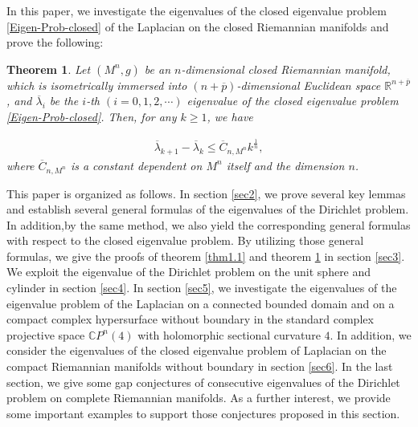\documentclass[12pt]{article}
\newtheorem{thm}{Theorem}[section]
\numberwithin{equation}{section}
\begin{document}
In this paper, we investigate the eigenvalues of the closed eigenvalue problem \eqref{Eigen-Prob-closed} of the Laplacian on the closed Riemannian manifolds and prove the following:

\begin{thm}
\label{thm1.2}Let $(M^{n},g)$ be an $n$-dimensional closed Riemannian manifold, which is isometrically immersed into $(n+\overline{p})$-dimensional Euclidean space $\mathbb{R}^{n+\overline{p}}$, and $\overline{\lambda}_{i}$ be the $i$-th $(i=0,1,2,\cdots)$
eigenvalue of the closed eigenvalue problem \eqref{Eigen-Prob-closed}. Then, for any $k\geq1$, we have


\begin{equation}\label{z1}\begin{aligned}\overline{\lambda}_{k+1}-\overline{\lambda}_{k}\leq
\overline{C}_{n,M^{n}}k^{\frac{1}{n}},\end{aligned}
\end{equation}
where $\overline{C}_{n,M^{n}}$ is a constant dependent on $M^{n}$ itself and the dimension $n$.
\end{thm}











\noindent
This paper is organized as follows. In section
\ref{sec2}, we prove several key lemmas and establish several general formulas of the eigenvalues of the Dirichlet problem. In addition,by the same method, we also yield the corresponding general formulas with respect to the closed eigenvalue problem. By
utilizing those general formulas, we give the proofs of
theorem \ref{thm1.1} and theorem \ref{thm1.2} in section \ref{sec3}. We exploit the eigenvalue of the Dirichlet problem on the unit sphere and cylinder in section \ref{sec4}.
In section \ref{sec5}, we investigate the eigenvalues of the eigenvalue problem of the Laplacian
on a connected bounded domain  and on a compact complex hypersurface without boundary in the standard
complex projective space $\mathbb{C}P^{n}(4)$ with holomorphic sectional curvature $4$. In addition, we consider the eigenvalues of the closed eigenvalue problem of Laplacian
on the compact Riemannian manifolds without boundary in section \ref{sec6}. In the last section, we give some gap conjectures of consecutive eigenvalues of the Dirichlet problem on complete Riemannian manifolds. As a further interest,
we provide some important examples to support those conjectures proposed in this section.
\end{document}
